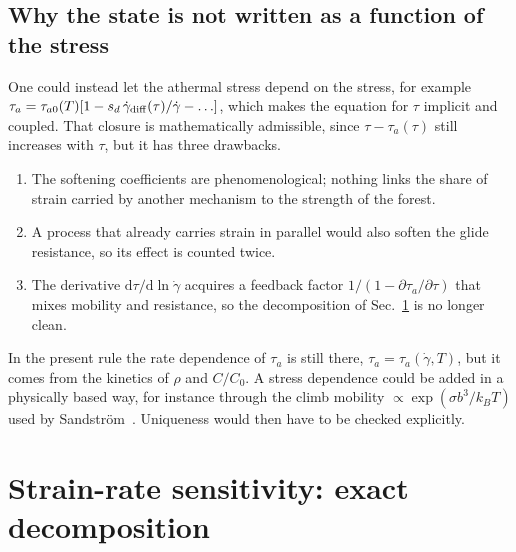 \documentclass[11pt]{article}
\newcommand{\gd}{\dot\gamma}
\newcommand{\kT}{k_BT}
\newcommand{\dd}{\mathrm{d}}
\numberwithin{equation}{section}
\begin{document}
\subsection{Why the state is not written as a function of the stress}
One could instead let the athermal stress depend on the stress, for example $\tau_a=\tau_{a0}(T)[1-s_d\,\gd_{\rm diff}(\tau)/\gd-\ldots]$, which makes the equation for $\tau$ implicit and coupled. That closure is mathematically admissible, since $\tau-\tau_a(\tau)$ still increases with $\tau$, but it has three drawbacks.
\begin{enumerate}
\item The softening coefficients are phenomenological; nothing links the share of strain carried by another mechanism to the strength of the forest.
\item A process that already carries strain in parallel would also soften the glide resistance, so its effect is counted twice.
\item The derivative $\dd\tau/\dd\ln\gd$ acquires a feedback factor $1/(1-\partial\tau_a/\partial\tau)$ that mixes mobility and resistance, so the decomposition of Sec.~\ref{sec:srs} is no longer clean.
\end{enumerate}
In the present rule the rate dependence of $\tau_a$ is still there, $\tau_a=\tau_a(\gd,T)$, but it comes from the kinetics of $\rho$ and $C/C_0$. A stress dependence could be added in a physically based way, for instance through the climb mobility $\propto\exp(\sigma b^3/\kT)$ used by Sandstr\"om~\cite{SandstromHallgren2012}. Uniqueness would then have to be checked explicitly.

\section{Strain-rate sensitivity: exact decomposition}
\label{sec:srs}
\end{document}
